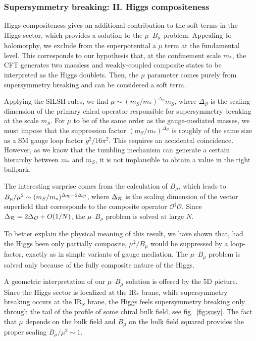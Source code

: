 \documentclass[a4paper,12pt]{article}
\def\fig#1{fig.~\ref{#1}}
\def\fig#1{fig.~\ref{#1}}
\def\O{\mathcal{O}}
\def\mst{m_*}
\def\mS{m_S}
\begin{document}
{{{{\subsubsection*{Supersymmetry breaking: II. Higgs compositeness}

Higgs compositeness gives an additional contribution to the soft terms in the Higgs sector, which provides a solution to the $\mu$--$B_\mu$ problem. Appealing to holomorphy, we exclude from the superpotential a $\mu$ term at the fundamental level. This corresponds to our hypothesis that, at the confinement scale $\mst$, the CFT generates two massless and weakly-coupled composite states to be interpreted as the Higgs doublets. Then, the $\mu$ parameter comes purely from supersymmetry breaking and can be considered a soft term. 

Applying the SILSH rules, we find $\mu \sim (\mS / \mst )^{\Delta_{\O}} \mS$, where $\Delta_{\O}$ is the scaling dimension of the primary chiral operator responsible for supersymmetry breaking at the scale $\mS$. For $\mu$ to be of the same order as the gauge-mediated masses, we must impose that the suppression factor $(\mS / \mst )^{\Delta_{\O}}$ is roughly of the same size as a SM gauge loop factor $g^2/16\pi^2$. This requires an accidental coincidence. However, as we know that the tumbling mechanism can generate a certain hierarchy between $\mst$ and $\mS$, it is not implausible to obtain a value in the right ballpark.

The interesting surprise comes from the calculation of $B_\mu$, which leads to  $B_\mu /\mu^2\sim (\mS / \mst )^{\Delta_{\cal R}-2\Delta_{\O}}$, where $\Delta_{\cal R}$ is the scaling dimension of the vector superfield that corresponds to the composite operator $\O^\dagger \O$. Since $\Delta_{\cal R}=2\Delta_{\O} +O(1/N)$, the $\mu$--$B_\mu$ problem is solved at large $N$.

To better explain the physical meaning of this result, we have shown that, had the Higgs been only partially composite, $\mu^2/B_\mu$ would be suppressed by a loop-factor, exactly as in simple variants of gauge mediation. The $\mu$--$B_\mu$ problem is solved only because of the fully composite nature of the Higgs.

A geometric interpretation of our $\mu$--$B_\mu$ solution is offered by the 5D picture. Since the Higgs sector is localized at the IR$_*$ brane, while supersymmetry breaking occurs at the IR$_S$ brane, the Higgs feels supersymmetry breaking only through the tail of the profile of some chiral bulk field, see \fig{fig:susy}. The fact that $\mu$ depends on the bulk field and $B_\mu$ on the bulk field squared provides the proper scaling $B_\mu /\mu^2\sim 1$.

}}}}
\end{document}
